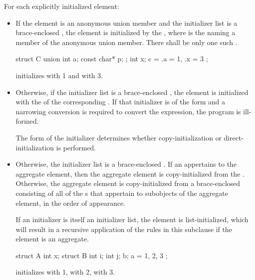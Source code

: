 \pnum
For each explicitly initialized element:
\begin{itemize}
\item
If the element is an anonymous union member and
the initializer list is
a brace-enclosed ,
the element is initialized by the
 \tcode{\{ }\tcode{ \}},
where  is the 
naming a member of the anonymous union member.
There shall be only one such .
\begin{example}
\begin{codeblock}
struct C {
  union {
    int a;
    const char* p;
  };
  int x;
} c = { .a = 1, .x = 3 };
\end{codeblock}
initializes  with 1 and  with 3.
\end{example}
\item
Otherwise, if the initializer list is
a brace-enclosed ,
the element is initialized with the 
of the corresponding .
If that initializer is of the form
\tcode{= }
and
a narrowing conversion is required
to convert the expression, the program is ill-formed.
\begin{note}
The form of the initializer determines
whether copy-initialization or direct-initialization is performed.
\end{note}
\item
Otherwise,
the initializer list is a brace-enclosed .
If an  appertains to the aggregate element,
then the aggregate element is copy-initialized from the .
Otherwise,
the aggregate element is copy-initialized
from a brace-enclosed 
consisting of all of the s
that appertain to subobjects of the aggregate element,
in the order of appearance.
\begin{note}
If an initializer is itself an initializer list,
the element is list-initialized, which will result in a recursive application
of the rules in this subclause if the element is an aggregate.
\end{note}
\begin{example}
\begin{codeblock}
struct A {
  int x;
  struct B {
    int i;
    int j;
  } b;
} a = { 1, { 2, 3 } };
\end{codeblock}
initializes
with 1,
with 2,
with 3.


\end{example}
\end{itemize}
